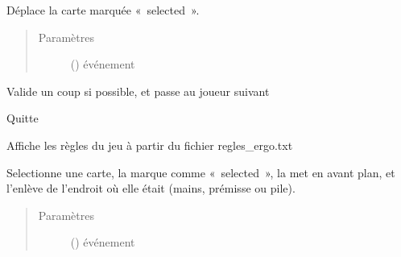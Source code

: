 \documentclass[letterpaper,10pt,french]{sphinxmanual}
\begin{document}
\begin{fulllineitems}
\begin{fulllineitems}
\label{\detokenize{doc_classe:gui.ErgoGui.move}}
Déplace la carte marquée « selected ».
\begin{quote}\begin{description}
\item[{Paramètres}] \leavevmode
{} () \textendash{} événement

\end{description}\end{quote}

\end{fulllineitems}


\begin{fulllineitems}
\label{\detokenize{doc_classe:gui.ErgoGui.play}}
Valide un coup si possible, et passe au joueur suivant

\end{fulllineitems}


\begin{fulllineitems}
\label{\detokenize{doc_classe:gui.ErgoGui.quitter}}
Quitte

\end{fulllineitems}


\begin{fulllineitems}
\label{\detokenize{doc_classe:gui.ErgoGui.rules}}
Affiche les règles du jeu à partir du fichier regles\_ergo.txt

\end{fulllineitems}


\begin{fulllineitems}
\label{\detokenize{doc_classe:gui.ErgoGui.select}}
Selectionne une carte, la marque comme « selected », la met en avant
plan, et l’enlève de l’endroit où elle était (mains, prémisse ou pile).
\begin{quote}\begin{description}
\item[{Paramètres}] \leavevmode
{} () \textendash{} événement


\end{description}
\end{quote}
\end{fulllineitems}
\end{fulllineitems}
\end{document}
